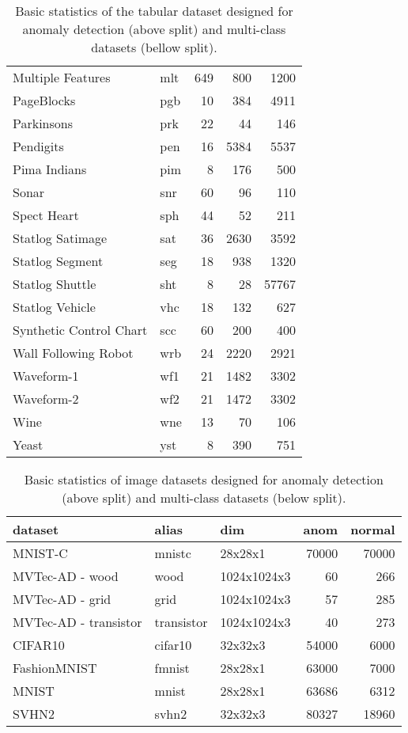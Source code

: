 \begin{table}
\begin{tabular}{llrrr}
Multiple Features & mlt & 649 & 800 & 1200  \\
PageBlocks & pgb & 10 & 384 & 4911  \\
Parkinsons & prk & 22 & 44 & 146  \\
Pendigits & pen & 16 & 5384 & 5537  \\
Pima Indians & pim & 8 & 176 & 500  \\
Sonar & snr & 60 & 96 & 110  \\
Spect Heart & sph & 44 & 52 & 211  \\
Statlog Satimage & sat & 36 & 2630 & 3592  \\
Statlog Segment & seg & 18 & 938 & 1320  \\
Statlog Shuttle & sht & 8 & 28 & 57767  \\
Statlog Vehicle & vhc & 18 & 132 & 627  \\
Synthetic Control Chart & scc & 60 & 200 & 400  \\
Wall Following Robot & wrb & 24 & 2220 & 2921  \\
Waveform-1 & wf1 & 21 & 1482 & 3302  \\
Waveform-2 & wf2 & 21 & 1472 & 3302  \\
Wine & wne & 13 & 70 & 106  \\
Yeast & yst & 8 & 390 & 751   \\\bottomrule
\end{tabular}
\vspace*{0.15cm}
\caption{Basic statistics of the tabular dataset designed for anomaly detection  (above split) and multi-class datasets  (bellow split).}
\label{tab:tabular_datasets}
\end{table}

\begin{table}
    \centering
    \tabcolsep=0.1cm
    \begin{tabular}{lllrr}
    \toprule
    \textbf{dataset} & \textbf{alias} & \textbf{dim} & \textbf{anom} & \textbf{normal} \\
    \midrule
    MNIST-C & mnistc & 28x28x1 & 70000 & 70000 \\
    MVTec-AD - wood & wood & 1024x1024x3 & 60 & 266 \\
    MVTec-AD - grid & grid & 1024x1024x3 & 57 & 285 \\
    MVTec-AD - transistor & transistor & 1024x1024x3 & 40 & 273 \\
    \midrule
    CIFAR10 & cifar10 & 32x32x3 & 54000 & 6000  \\
    FashionMNIST & fmnist & 28x28x1 & 63000 & 7000   \\
    MNIST & mnist & 28x28x1 & 63686 & 6312  \\
    SVHN2 & svhn2 & 32x32x3 & 80327 & 18960  \\\bottomrule
    \end{tabular}
    \vspace*{0.15cm}
    \caption{Basic statistics of image datasets designed for anomaly detection (above split) and multi-class datasets (below split).}
    \label{tab:image_datasets}
\end{table}

